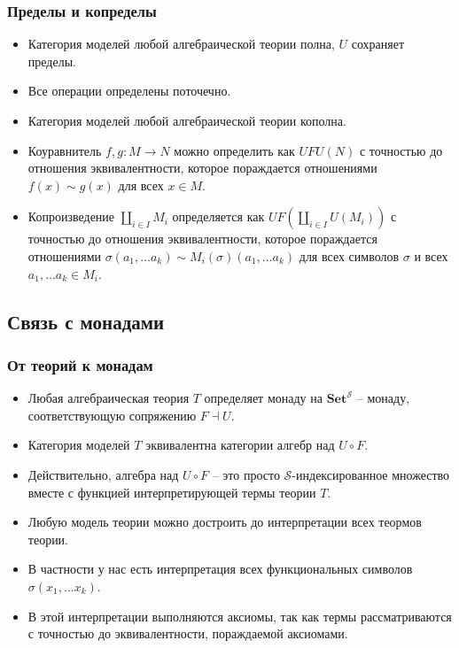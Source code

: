 \documentclass{beamer}
\theoremstyle{definition}
\newcommand{\cat}[1]{\mathbf{#1}}
\newcommand{\Set}{\cat{Set}}
\begin{document}
\begin{frame}
\frametitle{Пределы и копределы}
\begin{itemize}
\item Категория моделей любой алгебраической теории полна, $U$ сохраняет пределы.
\item Все операции определены поточечно.
\item Категория моделей любой алгебраической теории кополна.
\item Коуравнитель $f,g : M \to N$ можно определить как $U F U(N)$ с точностью до отношения эквивалентности, которое пораждается отношениями $f(x) \sim g(x)$ для всех $x \in M$.
\item Копроизведение $\coprod_{i \in I} M_i$ определяется как $U F (\coprod_{i \in I} U(M_i))$ с точностью до отношения эквивалентности,
которое пораждается отношениями $\sigma(a_1, \ldots a_k) \sim M_i(\sigma)(a_1, \ldots a_k)$ для всех символов $\sigma$ и всех $a_1, \ldots a_k \in M_i$.
\end{itemize}
\end{frame}

\subsection{Связь с монадами}

\begin{frame}
\frametitle{От теорий к монадам}
\begin{itemize}
\item Любая алгебраическая теория $T$ определяет монаду на $\Set^\mathcal{S}$ -- монаду, соответствующую сопряжению $F \dashv U$.
\item Категория моделей $T$ эквивалентна категории алгебр над $U \circ F$.
\item Действительно, алгебра над $U \circ F$ -- это просто $\mathcal{S}$-индексированное множество вместе с функцией интерпретирующей термы теории $T$.
\item Любую модель теории можно достроить до интерпретации всех теормов теории.
\item В частности у нас есть интерпретация всех функциональных символов $\sigma(x_1, \ldots x_k)$.
\item В этой интерпретации выполняются аксиомы, так как термы рассматриваются с точностью до эквивалентности, пораждаемой аксиомами.
\end{itemize}
\end{frame}
\end{document}
